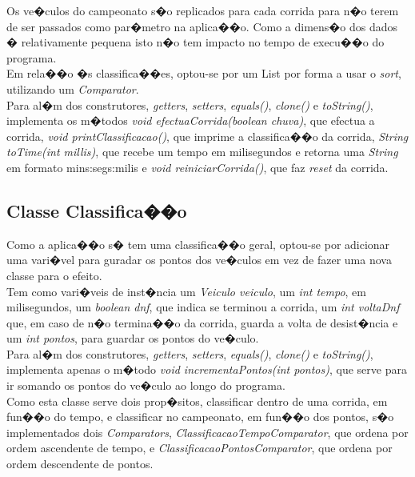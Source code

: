 \documentclass[10pt,notitlepage]{article}
\begin{document}
Os ve�culos do campeonato s�o replicados para cada corrida para n�o terem de ser passados como par�metro na aplica��o. Como a dimens�o dos dados � relativamente pequena isto n�o tem impacto no tempo de execu��o do programa. \\

Em rela��o �s classifica��es, optou-se por um List por forma a usar o \textit{sort}, utilizando um \textit{Comparator}.  \\

Para al�m dos construtores, \textit{getters}, \textit{setters}, \textit{equals()}, \textit{clone()} e \textit{toString()}, implementa os m�todos \textit{void efectuaCorrida(boolean chuva)}, que efectua a corrida, \textit{void printClassificacao()}, que imprime a classifica��o da corrida, \textit{String toTime(int millis)}, que recebe um tempo em milisegundos e retorna uma \textit{String} em formato mins:segs:milis e \textit{void reiniciarCorrida()}, que faz \textit{reset} da corrida.

\subsection{Classe Classifica��o}

Como a aplica��o s� tem uma classifica��o geral, optou-se por adicionar uma vari�vel para guradar os pontos dos ve�culos em vez de fazer uma nova classe para o efeito. \\

Tem como vari�veis de inst�ncia um \textit{Veiculo veiculo}, um \textit{int tempo}, em milisegundos, um \textit{boolean dnf}, que indica se terminou a corrida, um \textit{int voltaDnf} que, em caso de n�o termina��o da corrida, guarda a volta de desist�ncia e um \textit{int pontos}, para guardar os pontos do ve�culo. \\

Para al�m dos construtores, \textit{getters}, \textit{setters}, \textit{equals()}, \textit{clone()} e \textit{toString()}, implementa apenas o m�todo \textit{void incrementaPontos(int  pontos)}, que serve para ir somando os pontos do ve�culo ao longo do programa. \\

Como esta classe serve dois prop�sitos, classificar dentro de uma corrida, em fun��o do tempo, e classificar no campeonato, em fun��o dos pontos, s�o implementados dois \textit{Comparators}, \textit{ClassificacaoTempoComparator}, que ordena por ordem ascendente de tempo, e \textit{ClassificacaoPontosComparator}, que ordena por ordem descendente de pontos. \\
\end{document}
